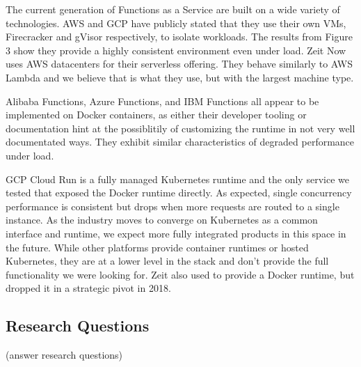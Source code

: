\documentclass[11pt]{article}
\begin{document}
The current generation of Functions as a Service
are built on a wide variety of technologies.
AWS and GCP have publicly stated that they use their own VMs,
Firecracker and gVisor respectively, to isolate workloads.
The results from Figure 3 %
show they provide a highly consistent environment even under load.
Zeit Now uses AWS datacenters %
for their serverless offering.
They behave similarly to AWS Lambda
and we believe that is what they use, but with the largest machine type.

Alibaba Functions, Azure Functions, and IBM Functions
all appear to be implemented on Docker containers,
as either their developer tooling or documentation
hint at the possiblitily of customizing the runtime
in not very well documentated ways.
They exhibit similar characteristics of degraded performance under load.

GCP Cloud Run is a fully managed Kubernetes runtime and
the only service we tested that exposed the Docker runtime directly.
As expected, single concurrency performance is consistent
but drops when more requests are routed to a single instance.
As the industry moves to converge on Kubernetes as a common interface and runtime,
we expect more fully integrated products in this space in the future.
While other platforms provide container runtimes or hosted Kubernetes,
they are at a lower level in the stack and don't provide the full functionality we were looking for.
Zeit also used to provide a Docker runtime, but dropped it in a strategic pivot in 2018.

\subsection{Research Questions}
(answer research questions)
\end{document}
